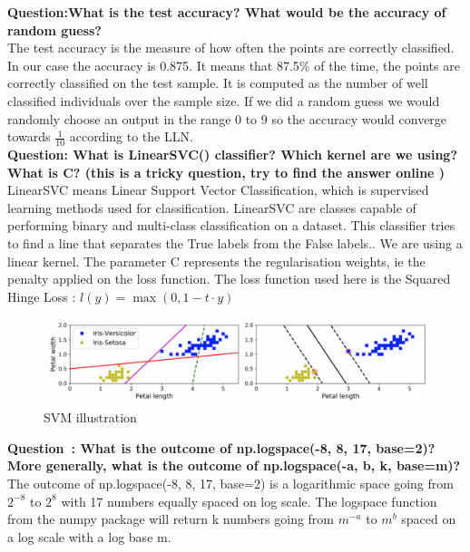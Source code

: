 \textbf{{Question}:What is the test accuracy? What would be the accuracy of random guess?} \\

The test accuracy is the measure of how often the points are correctly classified. In our case the accuracy is 0.875.  It means that 87.5\% of the time, the points are correctly classified on the test sample. It is computed as the number of well classified individuals over the sample size. If we did a random guess we would randomly choose an output in the range 0 to 9 so the accuracy would converge towards $\frac{1}{10}$ according to the LLN.  \\


\textbf{{Question}:  What is LinearSVC() classifier? Which kernel are we using? What is C? (this is a tricky question, try to find the answer online )}\\

LinearSVC means Linear Support Vector Classification, which is supervised learning methods used for classification. LinearSVC are classes capable of performing binary and multi-class classification on a dataset. 
This classifier tries to find a line that separates the True labels from the False labels.. We are using a linear kernel. The parameter C represents the regularisation weights, ie the penalty applied on the loss function. The loss function used here is the Squared Hinge Loss : $l(y)=\max(0,1-t\cdot y)$ \\


\begin{figure}[ht]
	\centering 
	\includegraphics[scale = 0.3]{Pics/SVM}
	\caption{SVM illustration}
	\label{fig:svmex}
\end{figure}

\textbf{{Question} : What is the outcome of np.logspace(-8, 8, 17, base=2)? More generally, what is the outcome of np.logspace(-a, b, k, base=m)?}\\

The outcome of np.logspace(-8, 8, 17, base=2) is a logarithmic space going from $2^{-8}$ to $2^8$ with 17 numbers equally spaced on log scale.
 The logspace function from the numpy package will return k numbers going from $m^{-a}$ to $m^b$ spaced on a log scale with a log base m. \\

